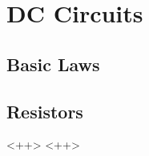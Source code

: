 \documentclass[../electromagnetism.tex]{subfiles}
\begin{document}
\section{DC Circuits}
\subsection{Basic Laws}
\subsection{Resistors}<++>
<++>
\end{document}
